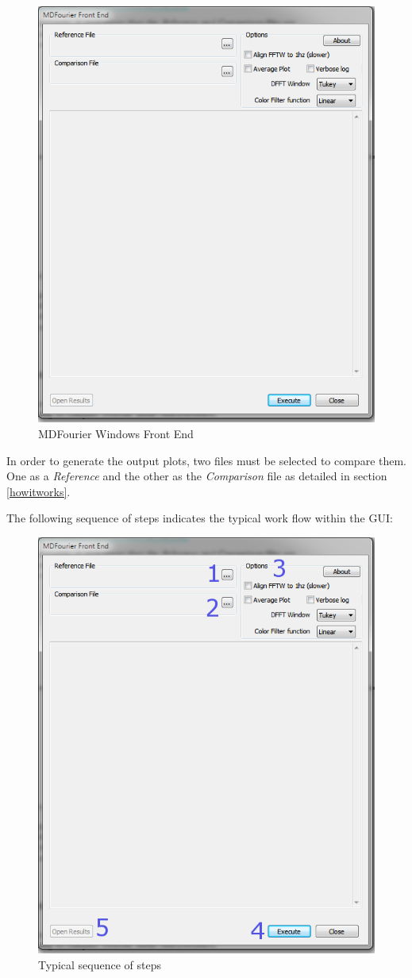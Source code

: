 \documentclass[10pt,a4paper]{report}
\begin{document}
\begin{figure}[H]
	\centering
	\includegraphics[width=0.6\linewidth]{plots/GUI1.png}
	\caption[Front End]{MDFourier Windows Front End}
	\label{fig:gui1}
\end{figure}

In order to generate the output plots, two files must be selected to compare them. One as a \textit{Reference} and the other as the \textit{Comparison} file as detailed in section \ref{howitworks}.

The following sequence of steps indicates the typical work flow within the GUI:

\begin{figure}[H]
	\centering
	\includegraphics[width=0.6\linewidth]{plots/GUI2.png}
	\caption[Steps]{Typical sequence of steps}
	\label{fig:gui2}
\end{figure}
\end{document}
